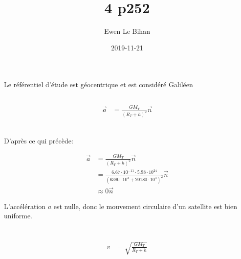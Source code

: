 \documentclass{article}
\title{4 p252}
\author{Ewen Le Bihan}
\date{2019-11-21}
\begin{document}
\section{}
\subsection{}

Le référentiel d'étude est géocentrique et est considéré Galiléen

\subsection{}

\begin{equation*}
  \begin{split}
    \vec a &= \frac{GM_T}{(R_T+h)^2} \vec n \\
  \end{split}
\end{equation*}

\subsection{}
D'après ce qui précède:

\begin{equation*}
  \begin{split}
    \vec a &= \frac{GM_T}{(R_T+h)^2} \vec n \\
           &= \frac{6.67\cdot10^{-11}\cdot5.98\cdot10^{24}}{(6380\cdot10^3+20180\cdot10^3)^2} \vec n \\
           &\approx 0 \vec n
  \end{split}
\end{equation*}

L'accélération $a$ est nulle, donc le mouvement circulaire d'un satellite est bien uniforme.

\section{}

\begin{equation*}
  \begin{split}
    v &= \sqrt{\frac{GM_T}{R_T+h}}
  \end{split}
\end{equation*}

\section{}
\end{document}

